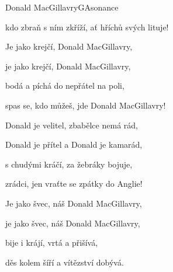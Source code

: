 \begin{song}{Donald MacGillavry}{G}{Asonance}
\begin{SBVerse}
kdo zbraň s ním zkříží, ať hříchů svých lituje!

\end{SBVerse}

\begin{SBVerse}

Je jako krejčí, Donald MacGillavry,

je jako krejčí, Donald MacGillavry,

bodá a píchá do nepřátel na poli,

spas se, kdo můžeš, jde Donald MacGillavry!

\end{SBVerse}

\begin{SBVerse}

Donald je velitel, zbabělce nemá rád,

Donald je přítel a Donald je kamarád,

s chudými kráčí, za žebráky bojuje,

zrádci, jen vraťte se zpátky do Anglie!

\end{SBVerse}

\begin{SBVerse}

Je jako švec, náš Donald MacGillavry,

je jako švec, náš Donald MacGillavry,

bije i krájí, vrtá a přišívá,

děs kolem šíří a vítězství dobývá.

\end{SBVerse}

\end{song}

\clearpage

